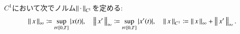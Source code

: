\begin{comment}
\begin{prf}\mbox{}
	\begin{description}
		\item[(1)] 
			各$k,j$に対して
			\begin{align}
				\int_s^u f^k_j(x_r)\ dx^j_r
				+ \int_u^t f^k_j(x_r)\ dx^j_r
				= \int_s^t f^k_j(x_r)\ dx^j_r
				\label{eq:thm_linearity_of_Riemann_Stieltjes_integral_1}
			\end{align}
			が成り立つことを示せばよい．
			以下，分割$D$に対するRiemann和$\sum_D f^k_j(x_{t_{i-1}})(x^j_{t_i} - x^j_{t_{i-1}})$を$\Sigma_D$と略記する．
			定理\ref{thm:existence_of_Riemann_Stieltjes_integral}より，
			任意の$\epsilon > 0$に対して或る$\delta > 0$が存在し，
			\begin{align}
				|D_1|,|D_2|,|D_3| < \delta,
				\quad \left(D_1 \in \delta[s,u],\ D_2 \in \delta[u,t],\ D_3 \in \delta[s,t] \right)
			\end{align}
			である限り
			\begin{align}
				\left| \int_s^u f^k_j(x_r)\ dx^j_r - \Sigma_{D_1} \right| < \epsilon,
				\quad \left| \int_u^t f^k_j(x_r)\ dx^j_r - \Sigma_{D_2} \right| < \epsilon,
				\quad \left| \int_s^t f^k_j(x_r)\ dx^j_r - \Sigma_{D_3} \right| < \epsilon
			\end{align}
			が成立する．$|D_1|,|D_2| < \delta/2$を満たす
			$D_1,D_2$を取り$D_3$をその合併とすれば，$|D_3| < \delta$かつ
			\begin{align}
				\Sigma_{D_1} + \Sigma_{D_2} = \Sigma_{D_3}
			\end{align}
			が成り立ち，
			\begin{align}
				&\left| \int_s^u f^k_j(x_r)\ dx^j_r + \int_u^t f^k_j(x_r)\ dx^j_r
					- \int_s^t f^k_j(x_r)\ dx^j_r \right| \\
				&\qquad \leq \left| \int_s^u f^k_j(x_r)\ dx^j_r - \Sigma_{D_1} \right|
				+ \left| \int_u^t f^k_j(x_r)\ dx^j_r - \Sigma_{D_2} \right|
				+ \left| \int_s^t f^k_j(x_r)\ dx^j_r - \Sigma_{D_3} \right| \\
				&\qquad < 3\epsilon
			\end{align}
			が従い(\refeq{eq:thm_linearity_of_Riemann_Stieltjes_integral_1})を得る．
		
		\item[(2)] 略．
		\QED
	\end{description}
\end{prf}

\end{comment}
$C^1$において次でノルム$\left\|\, \cdot\, \right\|_{C^1}$を定める:
\begin{align}
	\left\|\, x\, \right\|_{\infty} \coloneqq \operatorname*{sup}_{t \in [0,T]} |x(t)|,
	\quad \left\|\, x'\, \right\|_{\infty} \coloneqq \operatorname*{sup}_{t \in [0,T]} |x'(t)|,
	\quad \left\|\, x\, \right\|_{C^1} \coloneqq
	\left\|\, x\, \right\|_{\infty} + \left\|\, x'\, \right\|_{\infty}.
\end{align}

